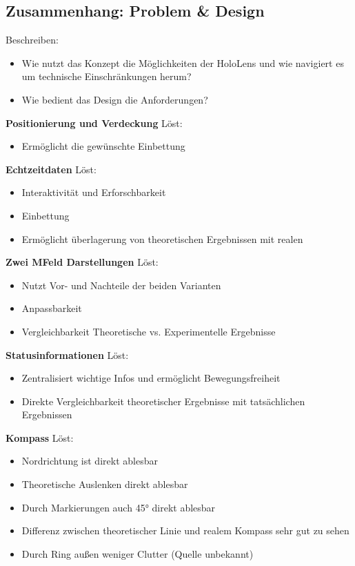 \subsection{Zusammenhang: Problem \& Design}
Beschreiben: 
\begin{itemize}
	\item Wie nutzt das Konzept die Möglichkeiten der HoloLens und wie navigiert es um technische Einschränkungen herum?
	\item Wie bedient das Design die Anforderungen?
\end{itemize}

\textbf{Positionierung und Verdeckung}
Löst:
\begin{itemize}
	\item Ermöglicht die gewünschte Einbettung
\end{itemize}

\textbf{Echtzeitdaten}
Löst:
\begin{itemize}
	\item Interaktivität und Erforschbarkeit
	\item Einbettung
	\item Ermöglicht überlagerung von theoretischen Ergebnissen mit realen
\end{itemize}

\textbf{Zwei MFeld Darstellungen}
Löst: 
\begin{itemize}
	\item Nutzt Vor- und Nachteile der beiden Varianten
	\item Anpassbarkeit
	\item Vergleichbarkeit Theoretische vs. Experimentelle Ergebnisse
\end{itemize}

\textbf{Statusinformationen}
Löst: 
\begin{itemize}
	\item Zentralisiert wichtige Infos und ermöglicht Bewegungsfreiheit
	\item Direkte Vergleichbarkeit theoretischer Ergebnisse mit tatsächlichen Ergebnissen
\end{itemize}

\textbf{Kompass}
Löst: 
\begin{itemize}
	\item Nordrichtung ist direkt ablesbar
	\item Theoretische Auslenken direkt ablesbar
	\item Durch Markierungen auch 45° direkt ablesbar
	\item Differenz zwischen theoretischer Linie und realem Kompass sehr gut zu sehen
	\item Durch Ring außen weniger Clutter (Quelle unbekannt)
\end{itemize}

